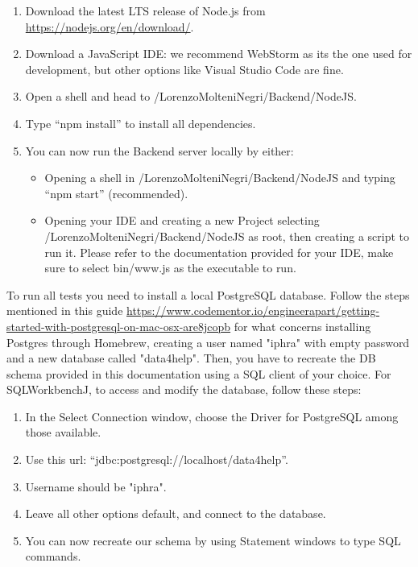 \documentclass[titlepage]{article}
\begin{document}
	\begin{enumerate}
		\item Download the latest LTS release of Node.js from \href{https://nodejs.org/en/download/}{https://nodejs.org/en/download/}.
		\item Download a JavaScript IDE: we recommend WebStorm as it\textsc{}s the one used for development, but other options like Visual Studio Code are fine.
		\item Open a shell and head to /LorenzoMolteniNegri/Backend/NodeJS.
		\item Type “npm install” to install all dependencies. 
		\item You can now run the Backend server locally by either:
		\begin{itemize}
			\item Opening a shell in /LorenzoMolteniNegri/Backend/NodeJS and typing “npm start” (recommended).
			\item Opening your IDE and creating a new Project selecting /LorenzoMolteniNegri/Backend/NodeJS as root, then creating a script to run it. Please refer to the documentation provided for your IDE, make sure to select bin/www.js as the executable to run.
		\end{itemize}
	\end{enumerate}
	To run all tests you need to install a local PostgreSQL database. \newline
	Follow the steps mentioned in this guide  \href{https://www.codementor.io/engineerapart/getting-started-with-postgresql-on-mac-osx-are8jcopb}{https://www.codementor.io/engineerapart/getting-started-with-postgresql-on-mac-osx-are8jcopb} for what concerns installing Postgres through Homebrew, creating a user named "iphra" with empty password and a new database called "data4help". \newline
	Then, you have to recreate the DB schema provided in this documentation using a SQL client of your choice. For SQLWorkbenchJ, to access and modify the database, follow these steps:
	\begin{enumerate}
		\item In the Select Connection window, choose the Driver for PostgreSQL among those available.
		\item Use this url: “jdbc:postgresql://localhost/data4help”.
		\item Username should be "iphra".
		\item Leave all other options default, and connect to the database.
		\item You can now recreate our schema by using Statement windows to type SQL commands.
	\end{enumerate}
	
\end{document}
